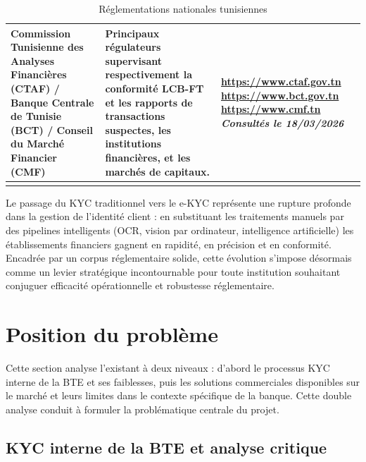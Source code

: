 \begin{longtable}{|p{4cm}|p{5.5cm}|p{4cm}|}
  \midrule
  Commission Tunisienne des Analyses Financières (CTAF) / Banque Centrale de Tunisie (BCT) / Conseil du Marché Financier (CMF) &
  Principaux régulateurs supervisant respectivement la conformité LCB-FT et les rapports de transactions suspectes, les institutions financières, et les marchés de capitaux. &
  \begin{minipage}[t]{3.8cm}
    {\scriptsize\textcolor{bleu_clair}{\url{https://www.ctaf.gov.tn}}}\newline
    {\scriptsize\textcolor{bleu_clair}{\url{https://www.bct.gov.tn}}}\newline
    {\scriptsize\textcolor{bleu_clair}{\url{https://www.cmf.tn}}}\newline
    {\scriptsize\textit{Consultés le 18/03/2026}}
  \end{minipage} \\
  \bottomrule
  \caption{Réglementations nationales tunisiennes}
  \label{tab:normes-natl}
\end{longtable}

Le passage du KYC traditionnel vers le e-KYC représente une rupture profonde dans la gestion de l'identité client : en substituant les traitements manuels par des pipelines intelligents (OCR, vision par ordinateur, intelligence artificielle) les établissements financiers gagnent en rapidité, en précision et en conformité. Encadrée par un corpus réglementaire solide, cette évolution s'impose désormais comme un levier stratégique incontournable pour toute institution souhaitant conjuguer efficacité opérationnelle et robustesse réglementaire.


\section{Position du problème}
\label{sec:position-probleme}

Cette section analyse l'existant à deux niveaux : d'abord le processus KYC interne de la BTE et ses faiblesses, puis les solutions commerciales disponibles sur le marché et leurs limites dans le contexte spécifique de la banque. Cette double analyse conduit à formuler la problématique centrale du projet.

\subsection{KYC interne de la BTE et analyse critique}
\label{subsec:etude-existant}

